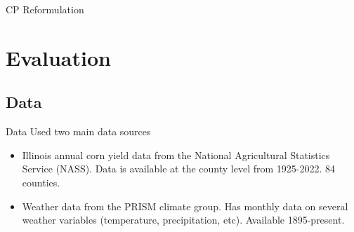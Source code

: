 \documentclass{beamer}
\begin{document}
\begin{frame}{CP Reformulation}
\end{frame}



\section{Evaluation}
\subsection{Data}
\begin{frame}{Data}
    Used two main data sources
    \begin{itemize}
        \setlength\itemsep{2em}
        \item Illinois annual corn yield data from the National Agricultural Statistics Service (NASS). Data is available at the county level from 1925-2022. 84 counties. 
        \item Weather data from the PRISM climate group. Has monthly data on several weather variables (temperature, precipitation, etc). Available 1895-present.
    \end{itemize}
\end{frame}
\end{document}
